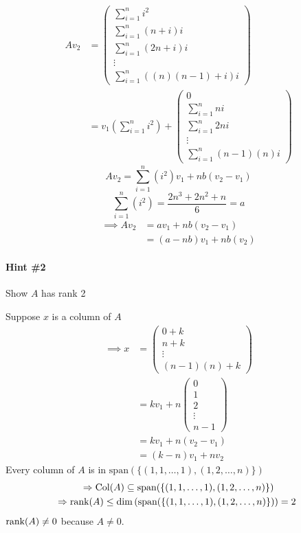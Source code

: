 \begin{align}
Av_2 &=
\begin{pmatrix}
 \sum\limits_{i=1}^n i^2\\
 \sum\limits_{i=1}^n (n+i)i\\
 \sum\limits_{i=1}^n (2n+i)i\\
 \vdots\\
 \sum\limits_{i=1}^n \left((n)(n-1)+i\right)i
\end{pmatrix}\\
&=v_1\left(\sum\limits_{i=1}^n i^2\right) + \begin{pmatrix}
0\\
 \sum\limits_{i=1}^n ni\\
 \sum\limits_{i=1}^n 2ni\\
\vdots\\
 \sum\limits_{i=1}^n(n-1)(n)i
\end{pmatrix}
\end{align}
\begin{equation}
Av_2 =  \sum\limits_{i=1}^n(i^2)v_1 + nb(v_2-v_1)
\end{equation}
\begin{equation}
\sum\limits_{i=1}^n(i^2) = \frac{2n^3 + 2n^2 +n}{6} = a
\end{equation}
\begin{align}
\implies Av_2 &= av_1 + nb(v_2-v_1)\\
&= (a-nb)v_1 + nb(v_2)
\end{align}
\paragraph{Hint \#2} Show $A$ has rank 2

Suppose $x$ is a column of $A$
\begin{align}
\implies x &= \begin{pmatrix}
0 + k\\
n + k\\
\vdots\\
(n-1)(n)+k
\end{pmatrix}\\
&= kv_1 + n\begin{pmatrix}
0\\
1\\
2\\
\vdots\\
n-1
\end{pmatrix}\\
&= kv_1 + n(v_2-v_1)\\
&= (k-n)v_1 + nv_2
\end{align}
Every column of $A$ is in
$\text{span}(\{(1,1,\dotsc,1),(1,2,\dotsc,n)\})$ 
\begin{gather}
\Rightarrow \text{Col}(A) \subseteq
\text{span}(\{(1,1,\dotsc,1),(1,2,\dotsc,n)\})\\
\Rightarrow \text{rank}({A}) \leq
\dim{\left(\text{span}(\{(1,1,\dotsc,1),(1,2,\dotsc,n)\})\right)}=2\
\end{gather}
$\text{rank}({A})\neq 0$ because $A\neq 0$.

